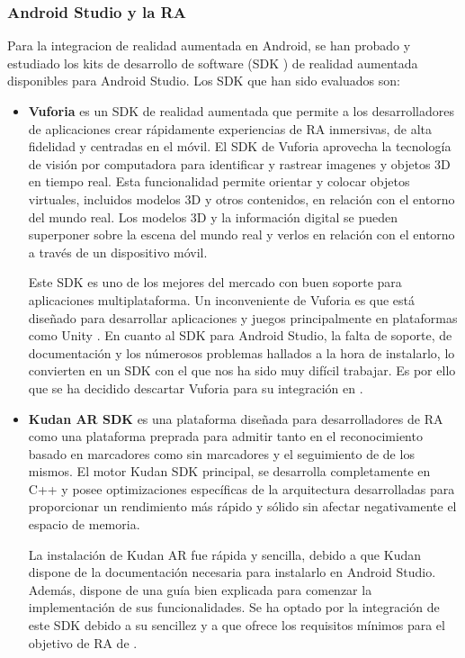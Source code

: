 \subsubsection{Android Studio y la RA}


Para la integracion de realidad aumentada en Android, se han probado y estudiado los kits de desarrollo de software (SDK \cite{URL::SDK}) de realidad aumentada disponibles para Android Studio. Los SDK que han sido evaluados son:



\begin{itemize}
    
    \item  \textbf{Vuforia} \cite{URL::vuforia} es un SDK de realidad aumentada que permite a los desarrolladores de aplicaciones crear rápidamente experiencias de RA inmersivas, de alta fidelidad y centradas en el móvil. El SDK de Vuforia aprovecha la tecnología de visión por computadora para identificar y rastrear imagenes y objetos 3D en tiempo real. Esta funcionalidad permite orientar y colocar objetos virtuales, incluidos modelos 3D y otros contenidos, en relación con el entorno del mundo real. Los modelos 3D y la información digital se pueden superponer sobre la escena del mundo real y verlos en relación con el entorno a través de un dispositivo móvil.
    
Este SDK es uno de los mejores del mercado con buen soporte para aplicaciones multiplataforma. 
Un inconveniente de Vuforia es que está diseñado para desarrollar aplicaciones y juegos principalmente en plataformas como Unity \cite{URL::Unity}. 
En cuanto al SDK para Android Studio, la falta de soporte, de documentación y los númerosos problemas hallados a la hora de instalarlo, lo convierten en un SDK con el que nos ha sido muy difícil trabajar. 
Es por ello que se ha decidido descartar Vuforia para su integración en \ULLAR{}.

    \item \textbf{Kudan AR SDK} \cite{URL::kudan} es una plataforma diseñada para desarrolladores de RA como una plataforma preprada para admitir tanto en el reconocimiento basado en marcadores como sin marcadores y el seguimiento de de los mismos. 
El motor Kudan SDK principal, se desarrolla completamente en C++ y posee optimizaciones específicas de la arquitectura desarrolladas para proporcionar un rendimiento más rápido y sólido sin afectar negativamente el espacio de memoria. 
    
La instalación de Kudan AR fue rápida y sencilla, debido a que Kudan dispone de la documentación necesaria para instalarlo en Android Studio. 
Además, dispone de una guía bien explicada para comenzar la implementación de sus funcionalidades. 
Se ha optado por la integración de este SDK debido a su sencillez y a que ofrece los requisitos mínimos para el objetivo de RA de \ULLAR{}.


\end{itemize}
